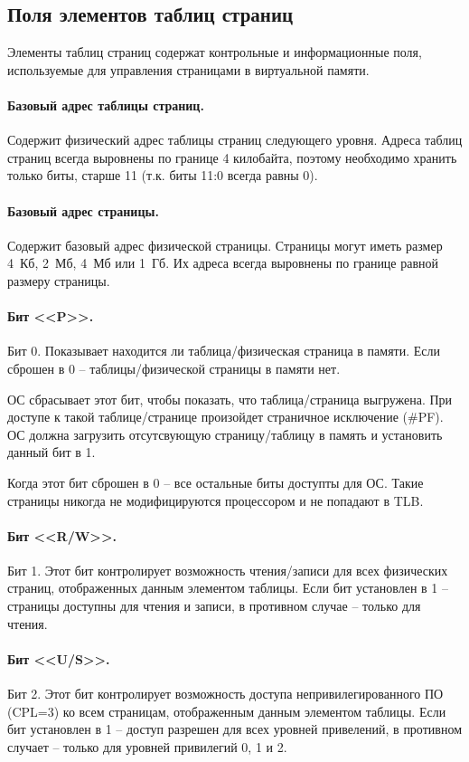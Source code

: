 \subsection{Поля элементов таблиц страниц}
\label{subsec:page_table_fields}
Элементы таблиц страниц содержат контрольные и информационные поля, используемые для управления
страницами в виртуальной памяти.

\paragraph{Базовый адрес таблицы страниц.} Содержит физический адрес таблицы страниц следующего уровня.
Адреса таблиц страниц всегда выровнены по границе 4 килобайта, поэтому необходимо хранить только биты, старше 11
(т.к. биты 11:0 всегда равны 0).

\paragraph{Базовый адрес страницы.} Содержит базовый адрес физической страницы. Страницы могут иметь размер 4~Кб, 2~Мб,
4~Мб или 1~Гб. Их адреса всегда выровнены по границе равной размеру страницы.

\paragraph{Бит <<P>>.} Бит 0. Показывает находится ли таблица/физическая страница в памяти. Если сброшен в 0 --
таблицы/физической страницы в памяти нет.

ОС сбрасывает этот бит, чтобы показать, что таблица/страница выгружена. При доступе к такой таблице/странице произойдет страничное
исключение (\#PF). ОС должна загрузить отсутсвующую страницу/таблицу в память и установить данный бит в 1.

Когда этот бит сброшен в 0 -- все остальные биты доступты для ОС. Такие страницы никогда не модифицируются процессором и
не попадают в TLB.

\paragraph{Бит <<R/W>>.} Бит 1. Этот бит контролирует возможность чтения/записи для всех физических страниц, отображенных
данным элементом таблицы. Если бит установлен в 1 -- страницы доступны для чтения и записи, в противном случае --
только для чтения.

\paragraph{Бит <<U/S>>.} Бит 2. Этот бит контролирует возможность доступа непривилегированного ПО (CPL=3) ко всем страницам,
отображенным данным элементом таблицы. Если бит установлен в 1 -- доступ разрешен для всех уровней привелений,
в противном случает -- только для уровней привилегий 0, 1 и 2.

